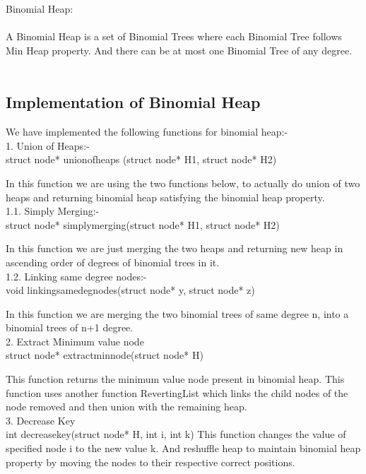 \documentclass[10pt,a4paper]{article}
\begin{document}
Binomial Heap:\\ \\
A Binomial Heap is a set of Binomial Trees where each Binomial Tree follows Min Heap property. And there can be at most one Binomial Tree of any degree. \\ \\


\subsection*{Implementation of Binomial Heap}

We have implemented the following functions for binomial heap:- \\ 
	

1. Union of Heaps:-\\
	struct node* unionofheaps (struct node* H1, struct node* H2) 
	
	In this function we are using the two functions below, to actually do union of two heaps  and returning binomial heap satisfying the binomial heap property.\\

1.1. Simply Merging:- 
	\\struct node* simplymerging(struct node* H1, struct node* H2) 
	
	In this function we are just merging the two heaps and returning new heap in ascending order of degrees of binomial trees in it.\\
	
	
1.2. Linking same degree nodes:-
	\\void linkingsamedegnodes(struct node* y, struct node* z) 
	
	In this function we are merging the two binomial trees of same degree n, into a binomial trees of n+1 degree.\\
	
2. Extract Minimum value node
	\\struct node* extractminnode(struct node* H)
	
	This function returns the minimum value node present in binomial heap.
	This function uses another function RevertingList which links the child nodes of the node removed and then union with the remaining heap. \\
	
3. Decrease Key
	\\int decreasekey(struct node* H, int i, int k) 
	This function changes the value of specified node i to the new value k. And reshuffle heap to maintain binomial heap property by moving the nodes to their respective correct positions.\\
\end{document}
